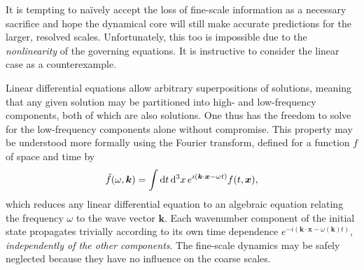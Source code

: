 \documentclass[titlepage]{article}
\numberwithin{equation}{section}
\renewcommand{\d}[1]{\mathrm{d}#1}
\renewcommand\vec{\bm}
\begin{document}
It is tempting to na\"{i}vely accept the loss of fine-scale information as a
necessary sacrifice and hope the dynamical core will still make accurate
predictions for the larger, resolved scales. Unfortunately, this too is
impossible due to the \emph{nonlinearity} of the governing equations. It is
instructive to consider the linear case as a counterexample.

Linear differential equations allow arbitrary superpositions of solutions,
meaning that any given solution may be partitioned into high- and low-frequency
components, both of which are also solutions. One thus has the freedom to solve
for the low-frequency components alone without compromise. This property may be
understood more formally using the Fourier transform, defined for a function
$f$ of space and time by
\[
    \tilde{f}(\omega, \vec{k})
        = \int \d{t}\,\d^3{x}\, e^{i(\vec{k} \cdot \vec{x} - \omega t)}
        f(t, \vec{x}),
\]
which reduces any linear differential equation to an algebraic equation
relating the frequency $\omega$ to the wave vector $\vec{k}$. Each wavenumber
component of the initial state propagates trivially according to its own
time dependence $e^{-i(\vec{k} \cdot \vec{x} - \omega(\vec{k}) t)}$,
\emph{independently of the other components}. The fine-scale dynamics may
be safely neglected because they have no influence on the coarse scales.
\end{document}
